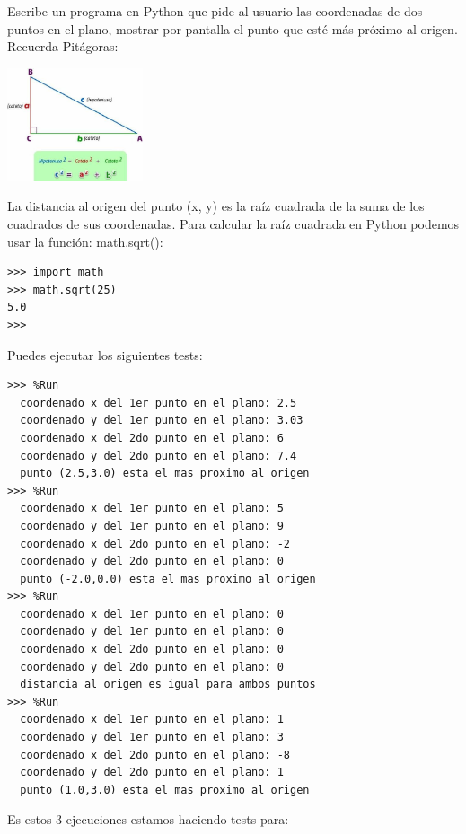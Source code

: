 \begin{ejercicio}\label{coords} Escribe un programa en Python que pide al usuario las coordenadas de dos puntos en el plano, mostrar por pantalla el punto que esté más próximo al origen. Recuerda Pitágoras:
    
    \includegraphics[width=0.3\textwidth]{book/Spanish/03_Conditionals_if_elif_else/images/ejemplo-del-teorema-de-pitagoras.jpeg}

La distancia al origen del punto (x, y) es la raíz cuadrada de la suma de los cuadrados de sus coordenadas. Para calcular la raíz cuadrada en Python podemos usar la función: math.sqrt():\\

\begin{Verbatim}[frame=single]
>>> import math
>>> math.sqrt(25)
5.0
>>> 
\end{Verbatim}

Puedes ejecutar los siguientes tests:\\

\begin{Verbatim}[frame=single, label={\em example test execution of the program}]
>>> %Run 
  coordenado x del 1er punto en el plano: 2.5
  coordenado y del 1er punto en el plano: 3.03
  coordenado x del 2do punto en el plano: 6
  coordenado y del 2do punto en el plano: 7.4
  punto (2.5,3.0) esta el mas proximo al origen
>>> %Run 
  coordenado x del 1er punto en el plano: 5
  coordenado y del 1er punto en el plano: 9
  coordenado x del 2do punto en el plano: -2
  coordenado y del 2do punto en el plano: 0
  punto (-2.0,0.0) esta el mas proximo al origen
>>> %Run 
  coordenado x del 1er punto en el plano: 0
  coordenado y del 1er punto en el plano: 0
  coordenado x del 2do punto en el plano: 0
  coordenado y del 2do punto en el plano: 0
  distancia al origen es igual para ambos puntos
>>> %Run 
  coordenado x del 1er punto en el plano: 1
  coordenado y del 1er punto en el plano: 3
  coordenado x del 2do punto en el plano: -8
  coordenado y del 2do punto en el plano: 1
  punto (1.0,3.0) esta el mas proximo al origen
\end{Verbatim}
 
Es estos 3 ejecuciones estamos haciendo tests para:


\end{ejercicio}
